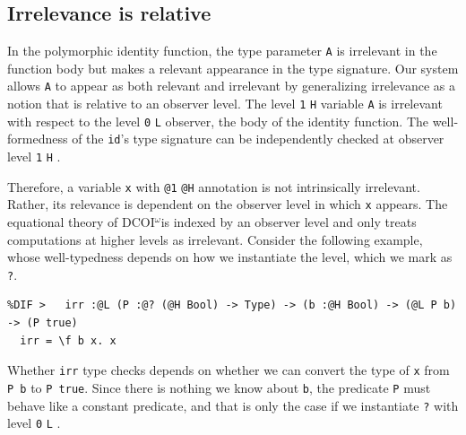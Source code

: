 \documentclass[acmsmall, screen=true, nonacm=true,
  review=\ifpublic false\else true\fi,
  anonymous=\ifanonymous true\else false\fi
]{acmart}
\makeatletter
\newcommand{\name}{\texorpdfstring{DCOI$^{\omega}$\@\xspace}{DCOI-omega}}
\providecommand{\DIFaddbegin}{} %
\providecommand{\DIFaddend}{} %
\providecommand{\DIFdelbegin}{} %
\providecommand{\DIFdelend}{} %
\providecommand{\DIFmodbegin}{} %
\providecommand{\DIFmodend}{} %
\makeatother
\begin{document}
\subsection{Irrelevance is relative}

In the polymorphic identity function, the type parameter \lstinline{A}
is irrelevant in the function body but makes a relevant appearance in
the type signature. Our system allows \lstinline{A} to appear as both
relevant and irrelevant by generalizing irrelevance as a notion that
is relative to an observer level. The level \DIFdelbegin %
{\color{red}%
\lstinline{1} %
}%
\DIFdelend \DIFaddbegin {\color{blue}%
\lstinline{H} %
}%
\DIFaddend variable \lstinline{A}
is irrelevant with respect to the level \DIFdelbegin %
{\color{red}%
\lstinline{0} %
}%
\DIFdelend \DIFaddbegin {\color{blue}%
\lstinline{L} %
}%
\DIFaddend observer, the body of the
identity function. The well-formedness of the \lstinline{id}'s type
signature can be independently checked at observer level \DIFdelbegin %
{\color{red}%
\lstinline{1}%
}%
\DIFdelend \DIFaddbegin {\color{blue}%
\lstinline{H}%
}%
\DIFaddend .

Therefore, a variable \lstinline{x} with \DIFdelbegin %
{\color{red}%
\lstinline{@1} %
}%
\DIFdelend \DIFaddbegin {\color{blue}%
\lstinline{@H} %
}%
\DIFaddend annotation
is not intrinsically irrelevant. Rather, its
relevance is dependent on the observer level in which \lstinline{x}
appears. The equational theory of \name is indexed by an observer
level and only treats computations at higher levels as irrelevant.
Consider the following example, whose well-typedness depends on how we
instantiate the level, which we mark as \lstinline{?}.

\DIFmodbegin
\begin{lstlisting}[alsolanguage=DIFcode]
%DIF <   irr :@0 (P :@? (@1 Bool) -> Type) -> (b :@1 Bool) -> (@0 P b) -> (P true)
%DIF >   irr :@L (P :@? (@H Bool) -> Type) -> (b :@H Bool) -> (@L P b) -> (P true)
  irr = \f b x. x
\end{lstlisting}
\DIFmodend

Whether \lstinline{irr} type checks depends on whether we can convert the
type of \lstinline{x} from \lstinline{P b} to
\lstinline{P true}. Since there is nothing we know about \lstinline{b},
the predicate \lstinline{P} must behave like a
constant predicate, and that is only the case if we instantiate \lstinline{?}
with level \DIFdelbegin %
{\color{red}%
\lstinline{0}%
}%
\DIFdelend \DIFaddbegin {\color{blue}%
\lstinline{L}%
}%
\DIFaddend .
\end{document}
